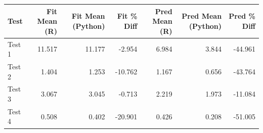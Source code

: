 
\begin{tabular}{l|r|r|r|r|r|r}
\hline
Test & Fit Mean (R) & Fit Mean (Python) & Fit \% Diff & Pred Mean (R) & Pred Mean (Python) & Pred \% Diff\\
\hline
Test 1 & 11.517 & 11.177 & -2.954 & 6.984 & 3.844 & -44.961\\
\hline
Test 2 & 1.404 & 1.253 & -10.762 & 1.167 & 0.656 & -43.764\\
\hline
Test 3 & 3.067 & 3.045 & -0.713 & 2.219 & 1.973 & -11.084\\
\hline
Test 4 & 0.508 & 0.402 & -20.901 & 0.426 & 0.208 & -51.005\\
\hline
\end{tabular}
